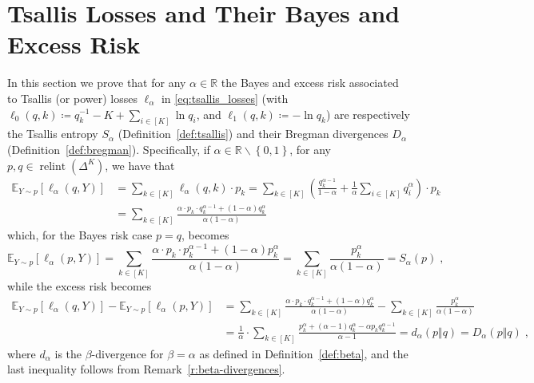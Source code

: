 \documentclass[11pt,oneside,a4paper]{article}
\newcommand{\E}{\mathbb{E}}
\newcommand{\R}{\mathbb{R}}
\newcommand{\lrb}[1]{\left(#1\right)}
\newcommand{\lsb}[1]{\left[#1\right]}
\newcommand{\lcb}[1]{\left\{#1\right\}}
\theoremstyle{plain}
\theoremstyle{definition}
\theoremstyle{remark}
\newcommand{\simplex}[1]{\Delta^{#1}}
\DeclareMathOperator*{\relint}{relint}
\begin{document}
\section{Tsallis Losses and Their Bayes and Excess Risk}
\label{app:loss_entropy_bregman}
In this section we prove that for any $\alpha \in \R$ the Bayes and excess risk associated to Tsallis (or power) losses $\ell_\alpha$ in \eqref{eq:tsallis_losses} (with $\ell_0(q,k) \coloneqq q_k^{-1} -K+\sum_{i \in [K]} \ln q_i$, and $\ell_1(q,k) \coloneqq -\ln q_k$) are respectively the Tsallis entropy $S_\alpha$ (Definition~\ref{def:tsallis}) and their Bregman divergences $D_\alpha$ (Definition~\ref{def:bregman}).
Specifically, if $\alpha \in \R \backslash \lcb{0,1}$, for any $p,q \in \relint\lrb{\simplex{K}}$, we have that
\begin{align*}   
    \E_{Y \sim p}\lsb{ \ell_\alpha(q,Y)}
&=
    \sum_{k\in[K]} \ell_\alpha(q,k)\cdot p_k
=
    \sum_{k \in [K]} \lrb{ \frac{q^{\alpha-1}_k}{1-\alpha}+\frac{1}{\alpha}\sum_{i \in [K]}q_i^\alpha}\cdot p_k
\\
&=
    \sum_{k \in [K]} \frac{\alpha \cdot p_k \cdot q^{\alpha-1}_k+(1-\alpha)q_k^\alpha}{\alpha(1-\alpha)}
\end{align*}
which, for the Bayes risk case $p = q$, becomes
\[
    \E_{Y \sim p}\lsb{ \ell_\alpha(p,Y)}
=
    \sum_{k \in [K]} \frac{\alpha \cdot p_k \cdot p^{\alpha-1}_k+(1-\alpha)p_k^\alpha}{\alpha(1-\alpha)}
=
    \sum_{k \in [K]} \frac{p_k^\alpha}{\alpha(1-\alpha)}
=
    S_\alpha(p)\;,
\]
while the excess risk becomes
\begin{align*}    
    \E_{Y \sim p}\lsb{ \ell_\alpha(q,Y)}-\E_{Y \sim p}\lsb{ \ell_\alpha(p,Y)}
&=
    \sum_{k \in [K]} \frac{\alpha \cdot p_k \cdot q^{\alpha-1}_k+(1-\alpha)q_k^\alpha}{\alpha(1-\alpha)}
    -
    \sum_{k \in [K]} \frac{p_k^\alpha}{\alpha(1-\alpha)}
\\
&=
    \frac{1}{\alpha} \cdot \sum_{k \in [K]} \frac{p_k^\alpha + (\alpha-1)q_k^\alpha-\alpha p_kq_k^{\alpha-1}}{\alpha-1}
=
    d_\alpha(p \Vert q)
=
    D_\alpha(p \Vert q)\;,
\end{align*} 
where $d_\alpha$ is the $\beta$-divergence for $\beta = \alpha$ as defined in Definition~\ref{def:beta}, and the last inequality follows from Remark~\ref{r:beta-divergences}.
\end{document}
